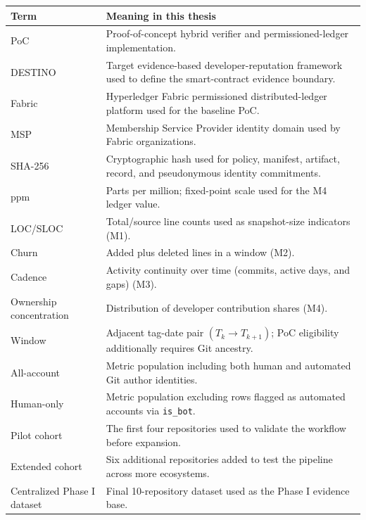 \label{sec:abbreviations}

\begin{center}
\footnotesize
\renewcommand{\arraystretch}{1.05}
\begin{tabularx}{\textwidth}{p{2.6cm}X}
\toprule
\textbf{Term} & \textbf{Meaning in this thesis} \\
\midrule
PoC & Proof-of-concept hybrid verifier and permissioned-ledger implementation. \\
DESTINO & Target evidence-based developer-reputation framework used to define the smart-contract evidence boundary. \\
Fabric & Hyperledger Fabric permissioned distributed-ledger platform used for the baseline PoC. \\
MSP & Membership Service Provider identity domain used by Fabric organizations. \\
SHA-256 & Cryptographic hash used for policy, manifest, artifact, record, and pseudonymous identity commitments. \\
ppm & Parts per million; fixed-point scale used for the M4 ledger value. \\
LOC/SLOC & Total/source line counts used as snapshot-size indicators (M1). \\
Churn & Added plus deleted lines in a window (M2). \\
Cadence & Activity continuity over time (commits, active days, and gaps) (M3). \\
Ownership concentration & Distribution of developer contribution shares (M4). \\
Window & Adjacent tag-date pair $(T_k \rightarrow T_{k+1})$; PoC eligibility additionally requires Git ancestry. \\
All-account & Metric population including both human and automated Git author identities. \\
Human-only & Metric population excluding rows flagged as automated accounts via \texttt{is\_bot}. \\
Pilot cohort & The first four repositories used to validate the workflow before expansion. \\
Extended cohort & Six additional repositories added to test the pipeline across more ecosystems. \\
Centralized Phase I dataset & Final 10-repository dataset used as the Phase I evidence base. \\
\bottomrule
\end{tabularx}
\end{center}






